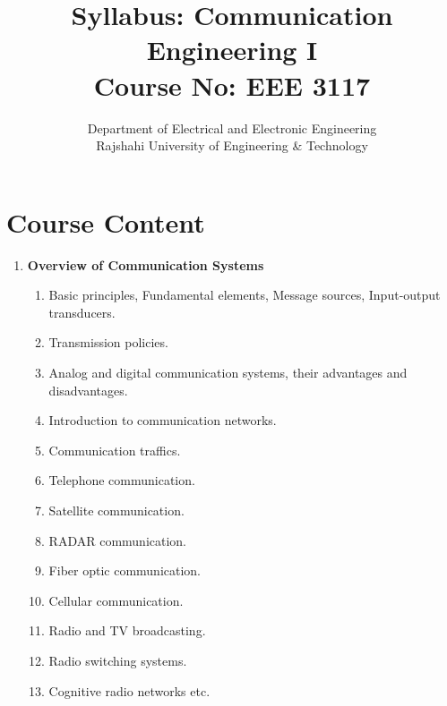 \documentclass[a4paper,12pt]{article}
\title{
	\Huge Syllabus: Communication Engineering I \\
	\vspace{0.2cm}
	\large Course No: EEE 3117
}
\author{
	Department of Electrical and Electronic Engineering \\
	Rajshahi University of Engineering \& Technology
}
\date{}
\begin{document}
	
	\maketitle
	\thispagestyle{empty}
	
	\section*{Course Content}
	\begin{enumerate}[leftmargin=*, align=left]
		
		\item \textbf{Overview of Communication Systems}
		\begin{enumerate}[label*=\arabic*.]
			\item Basic principles, Fundamental elements, Message sources, Input-output transducers.
			\item Transmission policies.
			\item Analog and digital communication systems, their advantages and disadvantages.
			\item Introduction to communication networks.
			\item Communication traffics.
			\item Telephone communication.
			\item Satellite communication.
			\item RADAR communication.
			\item Fiber optic communication.
			\item Cellular communication.
			\item Radio and TV broadcasting.
			\item Radio switching systems.
			\item Cognitive radio networks etc.
		\end{enumerate}
		

\end{enumerate}
\end{document}
